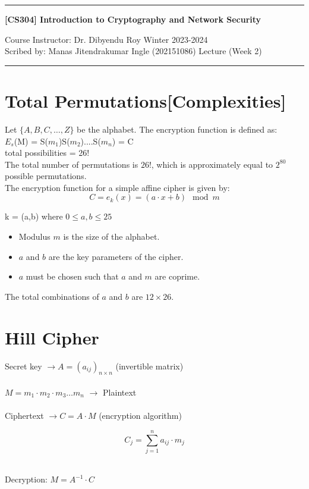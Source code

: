 \documentclass[11pt]{article}
\begin{document}
\rule{\textwidth}{1pt}
\begin{center}
{\bf [CS304] Introduction to Cryptography and Network Security}
\end{center}
Course Instructor: Dr. Dibyendu Roy \hfill Winter 2023-2024\\
Scribed by: Manas Jitendrakumar Ingle (202151086) \hfill Lecture (Week 2)
\\
\rule{\textwidth}{1pt}
\section{Total Permutations[Complexities]}

Let $\{A, B, C, \ldots, Z\}$ be the alphabet.
The encryption function is defined as:\\
$E_s$(M) = S($m_1$)S($m_2$)....S($m_n$) = C \\ 

total possibilities = 26! \\ 
The total number of permutations is $26!$, which is approximately equal to $2^{80}$ possible permutations.\\
The encryption function for a simple affine cipher is given by:
\[ C =  e_{k}(x) = (a \cdot x + b) \mod m \]


 k = (a,b)  where $0 \leq a,b \leq 25$ \\
\begin{itemize}
    \item Modulus $m$ is the size of the alphabet.
    \item $a$ and $b$ are the key parameters of the cipher.
    \item $a$ must be chosen such that $a$ and $m$ are coprime.
\end{itemize}
The total combinations of $a$ and $b$ are $12 \times 26$.

\section{Hill Cipher}
\begin{itemize}
     Secret key $\rightarrow A = (a_{ij})_{n \times n}$ \quad (invertible matrix)
    \\
    \\ $M = m_1 \cdot m_2 \cdot m_3 \ldots m_n$ \quad $\rightarrow$ Plaintext
    \\
    \\ Ciphertext $\rightarrow C = A \cdot M$ \quad (encryption algorithm)
    
    \[ C_j = \sum_{j=1}^{n} a_{ij} \cdot m_j \]
    
    \\ Decryption: $M = A^{-1} \cdot C$
\end{itemize}
\end{document}
